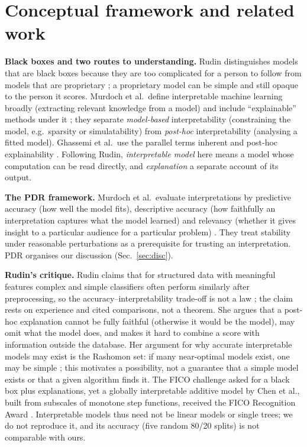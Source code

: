 \documentclass[11pt,a4paper]{article}
\begin{document}
\section{Conceptual framework and related work}
\textbf{Black boxes and two routes to understanding.} Rudin distinguishes models that are black boxes because they are too complicated for a person to follow from models that are proprietary \cite[App.~A]{rudin2019stop}; a proprietary model can be simple and still opaque to the person it scores. Murdoch et al.\ define interpretable machine learning broadly (extracting relevant knowledge from a model) and include ``explainable'' methods under it \cite{murdoch2019definitions}; they separate \emph{model-based} interpretability (constraining the model, e.g.\ sparsity or simulatability) from \emph{post-hoc} interpretability (analysing a fitted model). Ghassemi et al.\ use the parallel terms inherent and post-hoc explainability \cite{ghassemi2021false}. Following Rudin, \emph{interpretable model} here means a model whose computation can be read directly, and \emph{explanation} a separate account of its output.

\textbf{The PDR framework.} Murdoch et al.\ evaluate interpretations by predictive accuracy (how well the model fits), descriptive accuracy (how faithfully an interpretation captures what the model learned) and relevancy (whether it gives insight to a particular audience for a particular problem) \cite{murdoch2019definitions}. They treat stability under reasonable perturbations as a prerequisite for trusting an interpretation. PDR organises our discussion (Sec.~\ref{sec:disc}).

\textbf{Rudin's critique.} Rudin claims that for structured data with meaningful features complex and simple classifiers often perform similarly after preprocessing, so the accuracy--interpretability trade-off is not a law \cite{rudin2019stop}; the claim rests on experience and cited comparisons, not a theorem. She argues that a post-hoc explanation cannot be fully faithful (otherwise it would be the model), may omit what the model does, and makes it hard to combine a score with information outside the database. Her argument for why accurate interpretable models may exist is the Rashomon set: if many near-optimal models exist, one may be simple \cite{rudin2019stop,semenova2022existence}; this motivates a possibility, not a guarantee that a simple model exists or that a given algorithm finds it. The FICO challenge asked for a black box plus explanations, yet a globally interpretable additive model by Chen et al., built from subscales of monotone step functions, received the FICO Recognition Award \cite{rudin2019stop,chen2018interpretable,chen2022holistic}. Interpretable models thus need not be linear models or single trees; we do not reproduce it, and its accuracy (five random 80/20 splits) is not comparable with ours.
\end{document}
